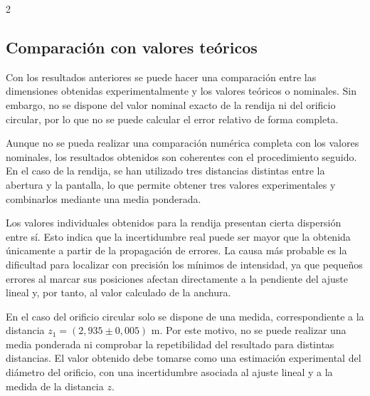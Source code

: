 \documentclass[12pt,a4paper]{article}
\begin{document}
\begin{multicols}{2}
\subsection{Comparación con valores teóricos}

\noindent
Con los resultados anteriores se puede hacer una comparación entre las dimensiones obtenidas experimentalmente y los valores teóricos o nominales. Sin embargo, no se dispone del valor nominal exacto de la rendija ni del orificio circular, por lo que no se puede calcular el error relativo de forma completa.

\begin{table}[H]
  \centering
  \caption{Comparación entre valores experimentales y teóricos.}
  \label{tab:comparacion}
  \scriptsize
  \setlength{\tabcolsep}{4pt}
\end{table}

\noindent
Aunque no se pueda realizar una comparación numérica completa con los valores nominales, los resultados obtenidos son coherentes con el procedimiento seguido. En el caso de la rendija, se han utilizado tres distancias distintas entre la abertura y la pantalla, lo que permite obtener tres valores experimentales y combinarlos mediante una media ponderada.

\noindent
Los valores individuales obtenidos para la rendija presentan cierta dispersión entre sí. Esto indica que la incertidumbre real puede ser mayor que la obtenida únicamente a partir de la propagación de errores. La causa más probable es la dificultad para localizar con precisión los mínimos de intensidad, ya que pequeños errores al marcar sus posiciones afectan directamente a la pendiente del ajuste lineal y, por tanto, al valor calculado de la anchura.

\noindent
En el caso del orificio circular solo se dispone de una medida, correspondiente a la distancia $z_1=(2{,}935\pm0{,}005)$ m. Por este motivo, no se puede realizar una media ponderada ni comprobar la repetibilidad del resultado para distintas distancias. El valor obtenido debe tomarse como una estimación experimental del diámetro del orificio, con una incertidumbre asociada al ajuste lineal y a la medida de la distancia $z$.


\end{multicols}
\end{document}
